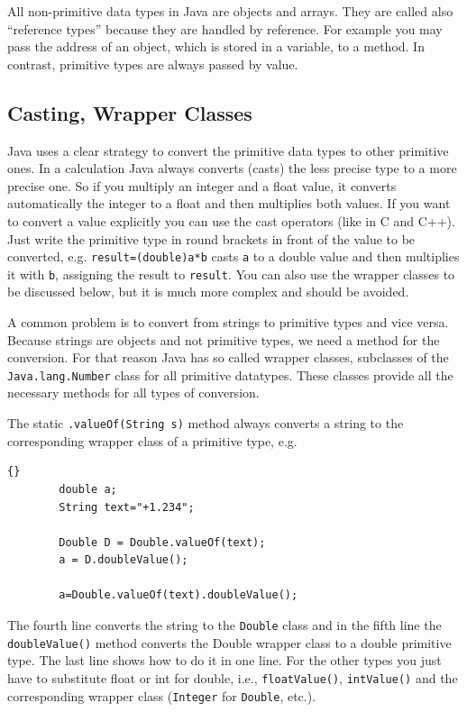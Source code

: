 All non-primitive data types in Java are objects and arrays. They are
called also ``reference types'' because they are handled by
reference. For example you may pass the address of an object, which is
stored in a variable, to a method. In contrast, primitive types are
always passed by value.


\subsection{Casting, Wrapper Classes}

Java uses a clear strategy to convert the primitive data types to 
other primitive ones. In a calculation Java always converts (casts)
the less precise type to a more precise one. So if you multiply an
integer and a float value, it converts automatically the integer to
a float and then multiplies both values. If you want to convert
a value explicitly you can use the cast operators (like in C and C++).
Just write the primitive type in round brackets in front of the value to
be converted, e.g. \verb|result=(double)a*b| casts \verb|a| to 
a double value and
then multiplies it with \verb|b|, assigning the result to \verb|result|.
You can also use the wrapper classes to be discussed below, but
it is much more complex and should be avoided.

A common problem is to convert from strings to primitive types and
vice versa. Because strings are objects and not primitive types, we
need a method for the conversion. For that reason Java has so called
wrapper classes, subclasses of the \verb|Java.lang.Number| class 
for all primitive datatypes. 
These classes provide all the necessary methods for all types of
conversion. 

The static \verb|.valueOf(String s)| method always converts a string
to the corresponding wrapper class of a primitive type, e.g. 
\begin{lstlisting}{}
        double a;
        String text="+1.234";

        Double D = Double.valueOf(text);
        a = D.doubleValue();

        a=Double.valueOf(text).doubleValue();
\end{lstlisting}
The fourth line converts the string to the \verb|Double| class and in the
fifth line 
the \verb|doubleValue()| method converts the Double wrapper class 
to a double primitive type. The last line shows how to do it in
one line.
For the other types you just have to substitute float or int 
for double, i.e., \verb|floatValue()|, \verb|intValue()| and the
corresponding wrapper class (\verb|Integer| for \verb|Double|, etc.).
 
